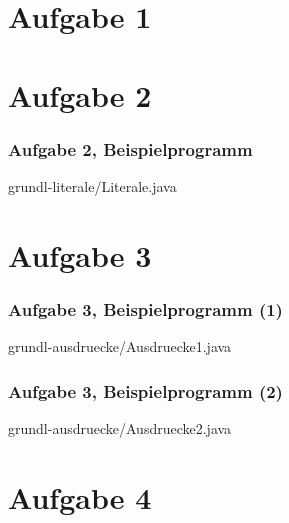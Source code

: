 \documentclass[c,18pt]{beamer}
\begin{document}
\section{Aufgabe 1}



\section{Aufgabe 2}



\begin{frame}[t]%
  \frametitle{Aufgabe 2, Beispielprogramm}%
\medskip


{grundl-literale/Literale.java}
\end{frame}

\section{Aufgabe 3}


\begin{frame}[t]%
  \frametitle{Aufgabe 3, Beispielprogramm (1)}%
\medskip


{grundl-ausdruecke/Ausdruecke1.java}
\end{frame}


\begin{frame}[t]%
  \frametitle{Aufgabe 3, Beispielprogramm (2)}%
\medskip


{grundl-ausdruecke/Ausdruecke2.java}
\end{frame}


\section{Aufgabe 4}

\end{document}

